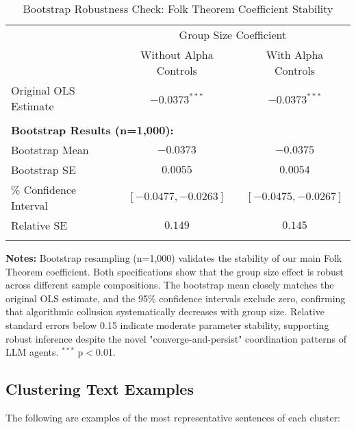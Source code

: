 \begin{table}[H]
    \centering
    \caption{Bootstrap Robustness Check: Folk Theorem Coefficient Stability}
    \label{tab:bootstrap_robustness}
    \begin{threeparttable}
    \begin{tabular}{lcc}
    \toprule
     & \multicolumn{2}{c}{Group Size Coefficient} \\
    \cmidrule(lr){2-3}
     & Without Alpha Controls & With Alpha Controls \\
    \midrule
    Original OLS Estimate & $-0.0373^{***}$ & $-0.0373^{***}$ \\
    \\
    \multicolumn{3}{l}{\textbf{Bootstrap Results (n=1,000):}} \\
    \quad Bootstrap Mean & $-0.0373$ & $-0.0375$ \\
    \quad Bootstrap SE & $0.0055$ & $0.0054$ \\
    \quad 95\% Confidence Interval & $[-0.0477, -0.0263]$ & $[-0.0475, -0.0267]$ \\
    \quad Relative SE & $0.149$ & $0.145$ \\
    \\
    \bottomrule
    \end{tabular}
    \begin{tablenotes}[flushleft]
    \footnotesize
    \item \textbf{Notes:} Bootstrap resampling (n=1,000) validates the stability of our main Folk Theorem coefficient. Both specifications show that the group size effect is robust across different sample compositions. The bootstrap mean closely matches the original OLS estimate, and the 95\% confidence intervals exclude zero, confirming that algorithmic collusion systematically decreases with group size. Relative standard errors below 0.15 indicate moderate parameter stability, supporting robust inference despite the novel "converge-and-persist" coordination patterns of LLM agents. $^{***}$ p$<$0.01.
    \end{tablenotes}
    \end{threeparttable}
\end{table}

\subsection*{Clustering Text Examples}\label{app:text_examples}

The following are examples of the most representative sentences of each cluster:

